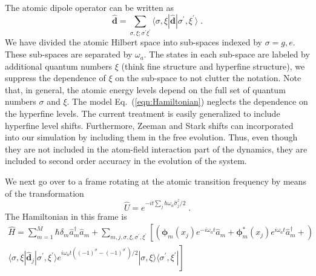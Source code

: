 \documentclass[aps, superscriptaddress, groupedaddress, preprint]{revtex4}
\renewcommand\vec{\mathbf}
\begin{document}
The atomic dipole operator can be written as
\begin{equation}
  \vec{\hat d} = \sum_{\sigma, \xi;\sigma^\prime \xi^\prime}
\langle \sigma, \xi|\vec{\hat{d}}|\sigma^\prime,\xi^\prime \rangle\;.
\end{equation}
We have divided the atomic Hilbert space into sub-spaces indexed
by $\sigma=g,e$.  These sub-spaces are separated by $\omega_a$.
The states in each sub-space are labeled by additional quantum
numbers $\xi$ (think fine structure and hyperfine structure), we
suppress the dependence of $\xi$ on the sub-space to not clutter
the notation.  Note that, in general, the atomic energy levels
depend on the full set of quantum numbers $\sigma$ and $\xi$.
The model Eq.~(\ref{eqn:Hamiltonian}) neglects the dependence on
the hyperfine levels.  The current treatment is easily
generalized to include hyperfine level shifts.  Furthermore,
Zeeman and Stark shifts can incorporated into our simulation by
including them in the free evolution.  Thus, even though they are
not included in the atom-field interaction part of the dynamics,
they are included to second order accuracy in the evolution of
the system.

We next go over to a frame rotating at the atomic transition
frequency by means of the transformation
\begin{equation}
\hat U = e^{-it\sum_j\hbar\omega_a\hat\sigma_j^z/2}\;.
\end{equation}
The Hamiltonian in this frame is
\begin{multline}
  \hat H = 
  \sum_{m=1}^M \hbar\delta_m\hat a_m^\dagger\hat a_m +
  \sum_{m,j,\sigma,\xi,\sigma^\prime,\xi^\prime}
  \left[
    \left(
      \vec{\phi}_m(x_j)e^{-i\omega_a t} \hat a_m + 
      \vec{\phi}_m^*(x_j)e^{i\omega_a t} \hat a_m^\dagger +
    \right)
  \right.\\
  \left.
    \langle \sigma,\xi| \vec{\hat d}_j | \sigma^\prime,\xi^\prime\rangle
    e^{i\omega_a t({(-1)}^\sigma-{(-1)}^{\sigma^\prime})/2}
    | \sigma,\xi\rangle \langle \sigma^\prime,\xi^\prime|
  \right]
\end{multline}
\end{document}
